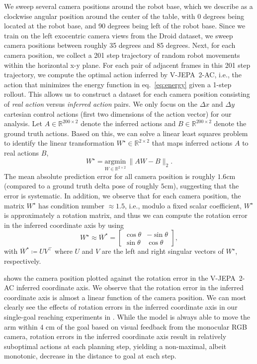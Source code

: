 \documentclass[]{fairmeta}
\newcommand{\acModel}{V-JEPA~2-AC\xspace}
\begin{document}
We sweep several camera positions around the robot base, which we describe as a clockwise angular position around the center of the table, with 0 degrees being located at the robot base, and 90 degrees being left of the robot base.
Since we train on the left exocentric camera views from the Droid dataset, we sweep camera positions between roughly 35 degrees and 85 degrees.
Next, for each camera position, we collect a 201 step trajectory of random robot movements within the horizontal x-y plane.
For each pair of adjacent frames in this 201 step trajectory, we compute the optimal action inferred by \acModel, i.e., the action that minimizes the energy function in eq.~\eqref{eq:energy} given a 1-step rollout.
This allows us to construct a dataset for each camera position consisting of \emph{real action} versus \emph{inferred action} pairs.
We only focus on the $\Delta x$ and $\Delta y$ cartesian control actions (first two dimensions of the action vector) for our analysis.
Let $A \in \mathbb{R}^{200 \times 2}$ denote the inferred actions and $B \in \mathbb{R}^{200 \times 2}$ denote the ground truth actions.
Based on this, we can solve a linear least squares problem to identify the linear transformation $W^\star \in \mathbb{R}^{2 \times 2}$ that maps inferred actions $A$ to real actions $B$,
\[
    W^\star = \underset{W \in \mathbb{R}^{2 \times 2}}{\text{argmin}}\ \lVert A W - B \rVert_2.
\]
The mean absolute prediction error for all camera position is roughly $1.6$cm (compared to a ground truth delta pose of roughly $5$cm), suggesting that the error is systematic.
In addition, we observe that for each camera position, the matrix $W^\star$ has condition number $\approx 1.5$, i.e., modulo a fixed scalar coefficient, $W^\star$ is approximately a rotation matrix, and thus we can compute the rotation error in the inferred coordinate axis by using
\[
    W^\star \approx \overline{W}^\star =
    \begin{bmatrix}
        \cos \theta & -\sin \theta \\
        \sin \theta & \cos \theta
    \end{bmatrix},
\]
with $\overline{W}^\star \coloneq U V^\top$ where $U$ and $V$ are the left and right singular vectors of $W^\star$, respectively.

 shows the camera position plotted against the rotation error in the \acModel inferred coordinate axis.
We observe that the rotation error in the inferred coordinate axis is almost a linear function of the camera position.
We can most clearly see the effects of rotation errors in the inferred coordinate axis in our single-goal reaching experiments in .
While the model is always able to move the arm within $4$ cm of the goal based on visual feedback from the monocular RGB camera, rotation errors in the inferred coordinate axis result in relatively suboptimal actions at each planning step, yielding a non-maximal, albeit monotonic, decrease in the distance to goal at each step.
\end{document}

